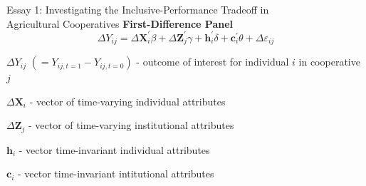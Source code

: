 \documentclass[aspectratio=169]{beamer}
\newenvironment{wideitemize}{\itemize\addtolength{\itemsep}{10pt}}{\enditemize}
\begin{document}
\begin{frame}{Essay 1: Investigating the Inclusive-Performance Tradeoff in \\ \hspace{1.7cm} Agricultural Cooperatives}
\textbf{First-Difference Panel} \vspace{.5cm}
            \begin{equation} \label{eq:E1_7}
                \Delta Y_{ij} = \Delta \mathbf{X}_i^{\prime}\beta + \Delta \mathbf{Z}_j^{\prime}\gamma + \mathbf{h}_i^{\prime}\delta + \mathbf{c}_i^{\prime}\theta + \Delta \varepsilon_{ij}
            \end{equation}  
    \begin{wideitemize}    
        \item $\Delta Y_{ij}$ $(= Y_{ij,t=1} - Y_{ij,t=0})$ - outcome of interest for individual $i$ in cooperative $j$
        \item $\Delta \mathbf{X}_i$ - vector of time-varying individual attributes
        \item $\Delta \mathbf{Z}_j$ - vector of time-varying institutional attributes
        \item $\mathbf{h}_i$ - vector time-invariant individual attributes
        \item $\mathbf{c}_i$ - vector time-invariant intitutional attributes
    \end{wideitemize}    
\end{frame}
\end{document}
